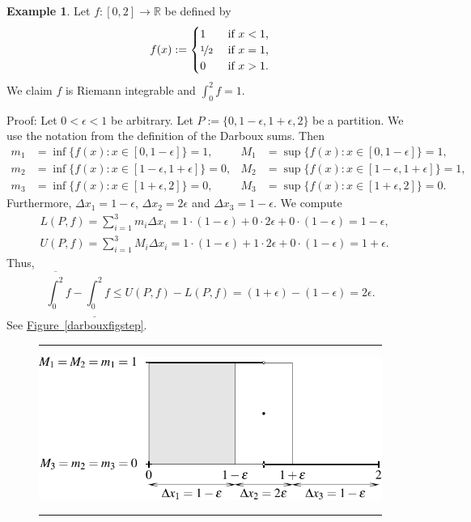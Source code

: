 \documentclass[12pt]{book}
\newenvironment{myfigureht}{%
\begin{figure}[h!t]
\noindent\rule{\textwidth}{0.4pt}\vspace{12pt}\par\centering}%
{\par\noindent\rule{\textwidth}{0.4pt}
\end{figure}}
\newcommand{\R}{{\mathbb{R}}}
\theoremstyle{plain}
\theoremstyle{remark}
\theoremstyle{definition}
\theoremstyle{exercise}
\theoremstyle{example}
\newtheorem{example}[thm]{Example}
\newcommand{\figureref}[1]{\hyperref[#1]{Figure~\ref*{#1}}}
\begin{document}
\begin{example}
Let $f \colon [0,2] \to \R$ be defined by
\begin{equation*}
f(x) :=
\begin{cases}
1 & \text{ if $x < 1$,}\\
\nicefrac{1}{2} & \text{ if $x = 1$,}\\
0 & \text{ if $x > 1$.}
\end{cases}
\end{equation*}
We claim $f$ is Riemann integrable and $\int_0^2 f = 1$.

Proof: Let $0 < \epsilon < 1$ be arbitrary.
Let $P := \{0, 1-\epsilon, 1+\epsilon, 2\}$ be a partition.  We use the notation from
the definition of the Darboux sums.  Then
\begin{align*}
m_1 &= \inf \{ f(x) : x \in [0,1-\epsilon] \} = 1 , & 
M_1 &= \sup \{ f(x) : x \in [0,1-\epsilon] \} = 1 , \\
m_2 &= \inf \{ f(x) : x \in [1-\epsilon,1+\epsilon] \} = 0 , & 
M_2 &= \sup \{ f(x) : x \in [1-\epsilon,1+\epsilon] \} = 1 , \\
m_3 &= \inf \{ f(x) : x \in [1+\epsilon,2] \} = 0 , & 
M_3 &= \sup \{ f(x) : x \in [1+\epsilon,2] \} = 0 .
\end{align*}
Furthermore, $\Delta x_1 = 1-\epsilon$, $\Delta x_2 = 2\epsilon$ and
$\Delta x_3 = 1-\epsilon$.
We compute
\begin{align*}
& L(P,f) = \sum_{i=1}^3 m_i \Delta x_i =
1 \cdot (1-\epsilon) + 0 \cdot 2\epsilon + 0 \cdot (1-\epsilon)
= 1-\epsilon , \\
& U(P,f) = \sum_{i=1}^3 M_i \Delta x_i =
1 \cdot (1-\epsilon) + 1 \cdot 2\epsilon + 0 \cdot (1-\epsilon)
= 1+\epsilon .
\end{align*}
Thus,
\begin{equation*}
\overline{\int_0^2} f - 
\underline{\int_0^2} f
\leq
U(P,f) - L(P,f)
=
(1+\epsilon)
- (1-\epsilon) = 2 \epsilon .
\end{equation*}
See \figureref{darbouxfigstep}.
\begin{myfigureht}
\includegraphics{figures/darbouxfigstep}

\end{myfigureht}
\end{example}
\end{document}
